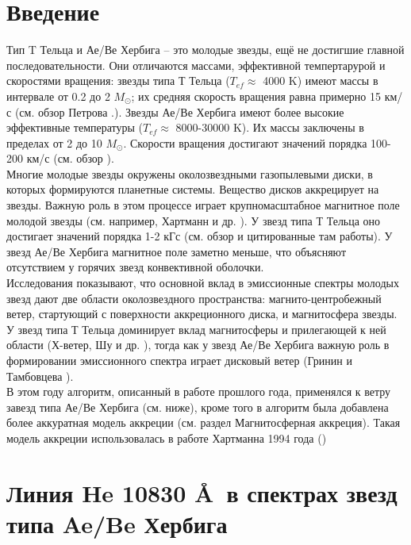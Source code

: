 \documentclass{article}
\begin{document}
\section{Введение}
Тип T Тельца и Ае/Ве Хербига -- это молодые звезды, ещё не достигшие главной последовательности. Они отличаются массами, эффективной темпертарурой и скоростями вращения: звезды типа Т Тельца ($T_{ef} \approx$ 4000 K) имеют массы в интервале от 0.2 до 2 $M_\odot$; их средняя скорость вращения равна примерно 15 км/с 
(см. обзор Петрова \cite{petrov}.). Звезды Ае/Ве Хербига имеют более высокие эффективные температуры ($T_{ef} \approx$ 8000-30000 K). Их массы заключены в пределах от 2 до 10 $M_\odot$. Скорости вращения достигают значений порядка 100-200 км/с (см. обзор \cite{waters98}). \\
Многие молодые звезды окружены околозвездными газопылевыми диски, в которых формируются планетные системы. Вещество дисков аккрецирует на звезды. 
Важную роль в этом процессе играет крупномасштабное магнитное поле молодой звезды (см. например, Хартманн и др. \cite{hartman94}). У звезд типа Т Тельца оно достигает значений порядка 1-2 кГс (см. обзор \cite{petrov} и цитированные там работы). У звезд Ае/Ве Хербига магнитное поле заметно меньше, что объясняют отсутствием у горячих звезд конвективной оболочки. \\

Исследования показывают, что основной вклад в эмиссионные спектры молодых звезд дают две области околозвездного пространства: 
магнито-центробежный ветер, стартующий с поверхности аккреционного диска, и магнитосфера звезды. У звезд типа Т Тельца доминирует вклад магнитосферы и прилегающей к ней области (Х-ветер, Шу и др. \cite{shu94}), тогда как у звезд Ае/Ве Хербига важную роль 
в формировании эмиссионного спектра играет дисковый ветер (Гринин и Тамбовцева \cite{grinin11}). \\
В этом году алгоритм, описанный в работе прошлого года, применялся к ветру завезд типа Ае/Ве Хербига (см. ниже), кроме того в алгоритм была добавлена более аккуратная модель аккреции (см. раздел Магнитосферная аккреция). Такая модель аккреции использовалась в работе Хартманна 1994 года (\cite{hartman94})


\section{Линия He 10830 \AA\ в спектрах звезд типа Ae/Be Хербига}
\end{document}
